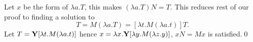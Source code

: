 \begin{pf} \rm
 Let $x$ be the form of $\lambda a.T$, this makes
 $(\lambda a.T) N = T$. This reduces rest of our proof to finding a solution to
\[
 T = M(\lambda a.T)= [ \lambda t. M(\lambda a.t) ] T.
\]
Let $T = \mathbf{Y}[\lambda t.M(\lambda a.t)]$ hence $x=\lambda x. 
\mathbf{Y}[\lambda y.M(\lambda z.y)]$, $xN=Mx$ is satisfied.\qed
\end{pf}
